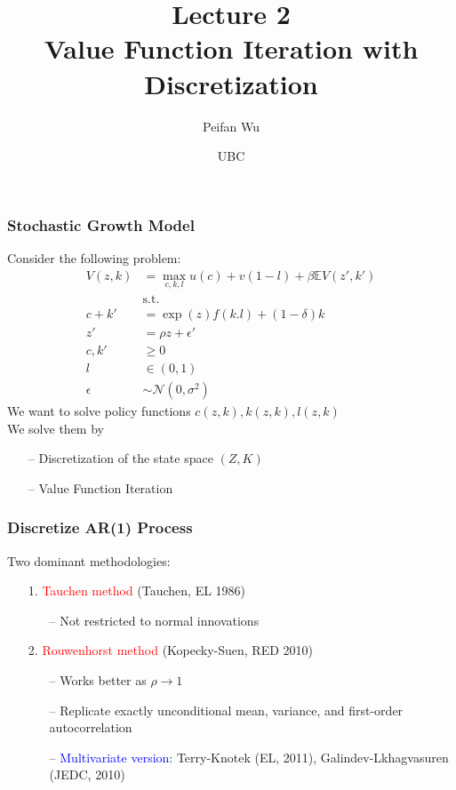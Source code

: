 \documentclass[aspectratio=169, 11pt]{beamer}
\begin{document}
\title{Lecture 2 \\ Value Function Iteration with Discretization}
\author[Wu]{Peifan Wu}
\date{UBC}

\begin{frame}
\titlepage
\end{frame}

\begin{frame}
\frametitle{Stochastic Growth Model}
  Consider the following problem:
  \begin{align*}
    V\left(z,k\right) & =\max_{c,k,l}u\left(c\right)+v\left(1-l\right)+\beta\mathbb{E}V\left(z',k'\right)\\
     & \text{s.t.}\\
    c+k' & =\exp\left(z\right)f\left(k.l\right)+\left(1-\delta\right)k\\
    z' & =\rho z+\epsilon'\\
    c,k' & \geqslant0\\
    l & \in\left(0,1\right)\\
    \epsilon & \sim\mathcal{N}\left(0,\sigma^{2}\right)
  \end{align*}
  We want to solve policy functions $c\left(z,k\right),k\left(z,k\right),l\left(z,k\right)$ \\
  \medskip
  We solve them by
  \begin{itemize}
    \item[--] Discretization of the state space $\left(Z, K\right)$
    \item[--] Value Function Iteration
  \end{itemize}
\end{frame}

\begin{frame}
\frametitle{Discretize AR(1) Process}
  Two dominant methodologies:
  \bigskip

  \begin{itemize}
    \item[1.] \textcolor{red}{Tauchen method} (Tauchen, EL 1986)
    \begin{itemize}
      \item[--] Not restricted to normal innovations
    \end{itemize}
    \bigskip
    \item[2.] \textcolor{red}{Rouwenhorst method} (Kopecky-Suen, RED 2010)
    \begin{itemize}
      \item[--] Works better as $\rho\to1$
      \item[--] Replicate exactly unconditional mean, variance, and first-order autocorrelation
      \item[--] \textcolor{blue}{Multivariate version}: Terry-Knotek (EL, 2011), Galindev-Lkhagvasuren (JEDC, 2010)
    \end{itemize}
  \end{itemize}
\end{frame}
\end{document}
